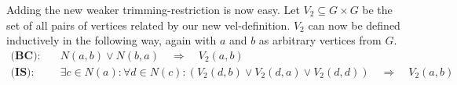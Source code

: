 Adding the new weaker trimming-restriction is now easy.
Let $V_2 \subseteq G \times G$ be the set of all pairs of vertices related by our new vel-definition.
$V_2$ can now be defined inductively in the following way, again with $a$ and $b$ as arbitrary vertices from $G$.
\begin{align}
  \textbf{(BC):}&\quad N(a,b) \vee N(b,a) \quad \Rightarrow \quad V_2(a,b)\\
  \textbf{(IS):}&\quad \exists c \in N(a):\forall d \in N(c): (V_2(d,b) \vee V_2(d,a) \vee V_2(d,d)) \quad \Rightarrow \quad V_2(a,b)
\end{align}
